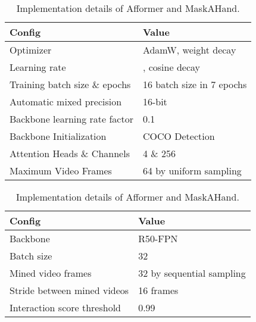\documentclass[10pt,twocolumn,letterpaper]{article}
\begin{document}
{\begin{table}[h]
\footnotesize
\centering
\begin{subtable}{\linewidth}
\centering
\begin{tabular}{l|l}
\hline
    Config & Value \\
    \hline
    Optimizer & AdamW, weight decay  \\
    Learning rate & , cosine decay \\
    Training batch size \& epochs & 16 batch size in 7 epochs \\ 
    Automatic mixed precision & 16-bit \\
    Backbone learning rate factor & 0.1 \\
    Backbone Initialization & COCO Detection~\cite{faster_rcnn,coco} \\
    Attention Heads \& Channels & 4 \& 256 \\
    Maximum Video Frames & 64 by uniform sampling\\
    \hline
\end{tabular}
\end{subtable}
\begin{subtable}{\linewidth}
\centering
\begin{tabular}{l|l}
\hline
    Config & Value \\
    \hline
    Backbone & R50-FPN~\cite{resnet,fpn} \\
    Batch size & 32 \\
    Mined video frames & 32 by sequential sampling\\
    Stride between mined videos & 16 frames \\
    Interaction score threshold & 0.99 \\
    \hline
\end{tabular}
\end{subtable}
\caption{Implementation details of Afformer and MaskAHand.}\label{tablea}
\end{table}

}
\end{document}
